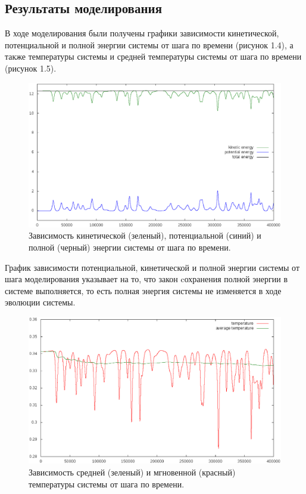 \documentclass[14pt,a4paper,report]{ncc}
\begin{document}
 \subsection{Результаты моделирования}
В ходе моделирования были получены графики зависимости кинетической, потенциальной и полной энергии системы от шага по времени (рисунок 1.4), а также температуры системы и средней температуры системы от шага по времени (рисунок 1.5).
\

\begin{figure}[!h]
\includegraphics[scale=0.6]{energy400}
\caption{Зависимость кинетической (зеленый), потенциальной (синий) и полной (черный) энергии системы от шага по времени.}
\end{figure}
График зависимости потенциальной, кинетической и полной энергии системы от шага моделирования указывает на то, что закон cохранения полной энергии в системе выполняется, то есть полная энергия системы не изменяется в ходе эволюции системы.
\begin{figure}[h!]
\includegraphics[scale=0.6]{temp400}
\caption{Зависимость средней (зеленый) и мгновенной (красный) температуры системы от шага по времени.}
\end{figure}
\end{document}
